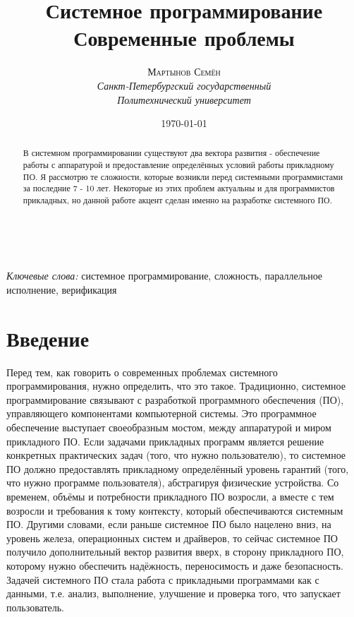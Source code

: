\documentclass[a4paper, 12pt]{article} %
\title{\textbf{Системное программирование}\\ %
Современные проблемы} %
\author{\textsc{Мартынов Семён} %
\\{\textit{Санкт-Петербургский государственный\\ Политехнический университет}}} %
\date{\today} %
\makeatletter
\renewcommand{\maketitle}{ %
\begin{flushright} %
{\LARGE\@title} %

\vspace{50pt} %

{\large\@author} %
\\\@date %

\vspace{40pt} %
\end{flushright}
}
\makeatother
\begin{document}
\maketitle %



\begin{abstract}

В системном программировании существуют два вектора развития - обеспечение работы с аппаратурой и предоставление определённых условий работы прикладному ПО. Я рассмотрю те сложности, которые возникли перед системными программистами за последние 7 - 10 лет. Некоторые из этих проблем актуальны и для программистов прикладных, но данной работе акцент сделан именно на разработке системного ПО.
\end{abstract}

\hspace*{3,6mm}\textit{Ключевые слова:} системное программирование, сложность, параллельное исполнение, верификация %

\vspace{30pt} %


\section*{Введение}

Перед тем, как говорить о современных проблемах системного программирования, нужно определить, что это такое. Традиционно, системное программирование связывают с разработкой программного обеспечения (ПО), управляющего компонентами компьютерной системы. Это программное обеспечение выступает своеобразным мостом, между аппаратурой и миром прикладного ПО. Если задачами прикладных программ является решение конкретных практических задач (того, что нужно пользователю), то системное ПО должно предоставлять прикладному определённый уровень гарантий (того, что нужно программе пользователя), абстрагируя физические устройства. Со временем, объёмы и потребности прикладного ПО возросли, а вместе с тем возросли и требования к тому контексту, который обеспечиваются системным ПО. Другими словами, если раньше системное ПО было нацелено вниз, на уровень железа, операционных систем и драйверов, то сейчас системное ПО получило дополнительный вектор развития вверх, в сторону прикладного ПО, которому нужно обеспечить надёжность, переносимость и даже безопасность. Задачей системного ПО стала работа с прикладными программами как с данными, т.е. анализ, выполнение, улучшение и проверка того, что запускает пользователь. 
\end{document}
